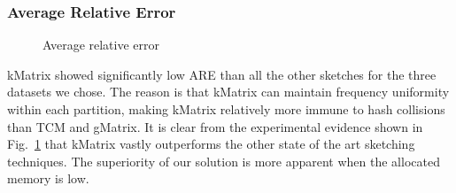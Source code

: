 \subsubsection{Average Relative Error}
\label{section:results_are}

\begin{figure}[htbp] 
    \centering
    \hfill
    \hfill
    \caption{Average relative error}
    \label{fig:edgq-queries-are-test}
\end{figure}

kMatrix showed significantly low ARE than all the other sketches for the three datasets we chose. The reason is that kMatrix can maintain frequency uniformity within each partition, making kMatrix relatively more immune to hash collisions than TCM and gMatrix. It is clear from the experimental evidence shown in Fig.~\ref{fig:edgq-queries-are-test} that kMatrix vastly outperforms the other state of the art sketching techniques. The superiority of our solution is more apparent when the allocated memory is low.

